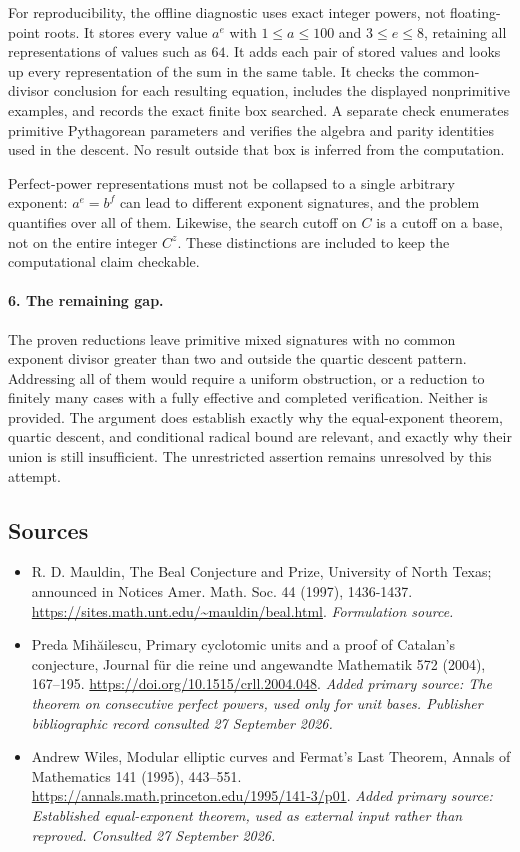 \documentclass[11pt]{article}
\begin{document}
For reproducibility, the offline diagnostic uses exact integer powers, not floating-point roots. It stores every value $a^e$ with $1\le a\le100$ and $3\le e\le8$, retaining all representations of values such as $64$. It adds each pair of stored values and looks up every representation of the sum in the same table. It checks the common-divisor conclusion for each resulting equation, includes the displayed nonprimitive examples, and records the exact finite box searched. A separate check enumerates primitive Pythagorean parameters and verifies the algebra and parity identities used in the descent. No result outside that box is inferred from the computation.

Perfect-power representations must not be collapsed to a single arbitrary exponent: $a^e=b^f$ can lead to different exponent signatures, and the problem quantifies over all of them. Likewise, the search cutoff on $C$ is a cutoff on a base, not on the entire integer $C^z$. These distinctions are included to keep the computational claim checkable.

\paragraph{6. The remaining gap.}
The proven reductions leave primitive mixed signatures with no common exponent divisor greater than two and outside the quartic descent pattern. Addressing all of them would require a uniform obstruction, or a reduction to finitely many cases with a fully effective and completed verification. Neither is provided. The argument does establish exactly why the equal-exponent theorem, quartic descent, and conditional radical bound are relevant, and exactly why their union is still insufficient. The unrestricted assertion remains unresolved by this attempt.

\subsection{Sources}
\begin{itemize}
\item[S1]R. D. Mauldin, The Beal Conjecture and Prize, University of North Texas; announced in Notices Amer. Math. Soc. 44 (1997), 1436-1437.
\url{https://sites.math.unt.edu/~mauldin/beal.html}.
\textit{Formulation source.}
\item[E1]Preda Mih\u{a}ilescu, Primary cyclotomic units and a proof of Catalan's conjecture, Journal f\"ur die reine und angewandte Mathematik 572 (2004), 167--195.
\url{https://doi.org/10.1515/crll.2004.048}.
\textit{Added primary source: The theorem on consecutive perfect powers, used only for unit bases. Publisher bibliographic record consulted 27 September 2026.}
\item[E2]Andrew Wiles, Modular elliptic curves and Fermat's Last Theorem, Annals of Mathematics 141 (1995), 443--551.
\url{https://annals.math.princeton.edu/1995/141-3/p01}.
\textit{Added primary source: Established equal-exponent theorem, used as external input rather than reproved. Consulted 27 September 2026.}
\end{itemize}
\end{document}
